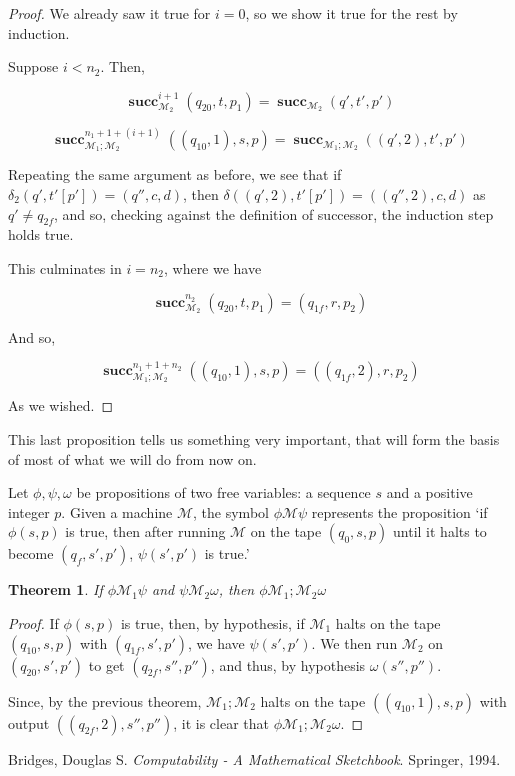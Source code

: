 \documentclass{article}
\newtheorem{theorem}{Theorem}
\newcommand{\M}{\mathcal{M}}
\DeclareMathOperator{\suc}{\mathbf{succ}}
\begin{document}
\begin{proof}
	We already saw it true for $i=0$, so we show it true for the rest by induction.
	
	Suppose $i < n_2$. Then,
	
	\[\suc^{i+1}_{\M_2} (q_{20}, t, p_1) = \suc_{\M_2} (q', t', p')\]
	
	\[\suc^{n_1+1+(i+1)}_{\M_1;\M_2} ((q_{10}, 1), s, p) = \suc_{\M_1;\M_2} ((q', 2), t', p')\]
	
	Repeating the same argument as before, we see that if $\delta_2(q', t'[p']) = (q'', c, d)$, then $\delta((q',2), t'[p']) = ((q'', 2), c, d)$ as $q' \neq q_{2f}$, and so, checking against the definition of successor, the induction step holds true.
	
	This culminates in $i = n_2$, where we have
	
	\[\suc^{n_2}_{\M_2} (q_{20}, t, p_1) = (q_{1f}, r, p_2)\]
	
	And so,
	
	\[\suc^{n_1 + 1 + n_2}_{\M_1;\M_2} ((q_{10},1), s, p) = ((q_{1f},2), r, p_2)\]
	
	As we wished.
	\end{proof}
	
	This last proposition tells us something very important, that will form the basis of most of what we will do from now on.
	
	Let $\phi, \psi, \omega$ be propositions of two free variables: a sequence $s$ and a positive integer $p$. Given a machine $\M$, the symbol $\phi\M\psi$ represents the proposition `if $\phi(s,p)$ is true, then after running $\M$ on the tape $(q_0, s, p)$ until it halts to become $(q_f, s', p')$, $\psi(s', p')$ is true.'
	
	
	\begin{theorem}
	If $\phi \M_1 \psi$ and $\psi \M_2 \omega$, then $\phi \M_1;\M_2 \omega$
	\end{theorem}
	
	\begin{proof}
	If $\phi(s,p)$ is true, then, by hypothesis, if $\M_1$ halts on the tape $(q_{10}, s, p)$ with $(q_{1f}, s', p')$, we have $\psi(s', p')$. We then run $\M_2$ on $(q_{20}, s', p')$ to get $(q_{2f}, s'', p'')$, and thus, by hypothesis $\omega(s'', p'')$.
	
	Since, by the previous theorem, $\M_1;\M_2$ halts on the tape $((q_{10}, 1),s,p)$ with output $((q_{2f}, 2), s'', p'')$, it is clear that $\phi \M_1;\M_2 \omega$.
	
	\end{proof}

	
\begin{thebibliography}{9}
Bridges, Douglas S.
\textit{Computability - A Mathematical Sketchbook}. 
Springer, 1994. %
\end{thebibliography}	
\end{document}
